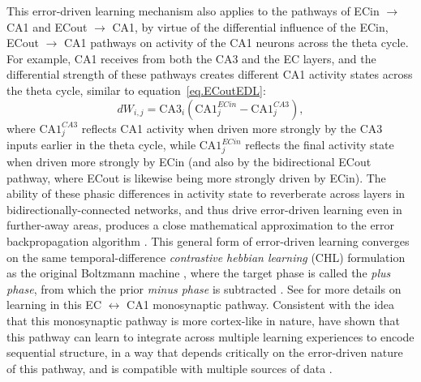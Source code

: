 \documentclass[11pt,twoside]{article}
\newif\myifpdf
\begin{document}
This error-driven learning mechanism also applies to the pathways of ECin $\rightarrow$ CA1 and ECout $\rightarrow$ CA1, by virtue of the differential influence of the ECin, ECout $\rightarrow$ CA1 pathways on activity of the CA1 neurons across the theta cycle.  For example, CA1 receives from both the CA3 and the EC layers, and the differential strength of these pathways creates different CA1 activity states across the theta cycle, similar to equation~\ref{eq.ECoutEDL}:
\begin{equation}
\label{eq.CA1EDL}
    dW_{i,j} = \mbox{CA3}_i ( \mbox{CA1}_j^{ECin} - \mbox{CA1}_j^{CA3} ) ,
\end{equation}
where $\mbox{CA1}_j^{CA3}$ reflects CA1 activity when driven more strongly by the CA3 inputs earlier in the theta cycle, while $\mbox{CA1}_j^{ECin}$ reflects the final activity state when driven more strongly by ECin (and also by the bidirectional ECout pathway, where ECout is likewise being more strongly driven by ECin).  The ability of these phasic differences in activity state to reverberate across layers in bidirectionally-connected networks, and thus drive error-driven learning even in further-away areas, produces a close mathematical approximation to the error backpropagation algorithm \citep{OReilly96,WhittingtonBogacz19,LillicrapSantoroMarrisEtAl20}.  This general form of error-driven learning converges on the same temporal-difference \emph{contrastive hebbian learning} (CHL) formulation as the original Boltzmann machine \citep{AckleyHintonSejnowski85}, where the target phase is called the \emph{plus phase}, from which the prior \emph{minus phase} is subtracted \citep{OReillyMunakataFrankEtAl12,OReillyMunakata00,OReillyRussinZolfagharEtAl21}.  See \citet{KetzMorkondaOReilly13} for more details on learning in this EC $\leftrightarrow$ CA1 monosynaptic pathway.  Consistent with the idea that this monosynaptic pathway is more cortex-like in nature, \citet{SchapiroTurk-BrowneBotvinickEtAl17} have shown that this pathway can learn to integrate across multiple learning experiences to encode sequential structure, in a way that depends critically on the error-driven nature of this pathway, and is compatible with multiple sources of data \citep{SchapiroTurk-BrowneNormanEtAl16}.
\end{document}
